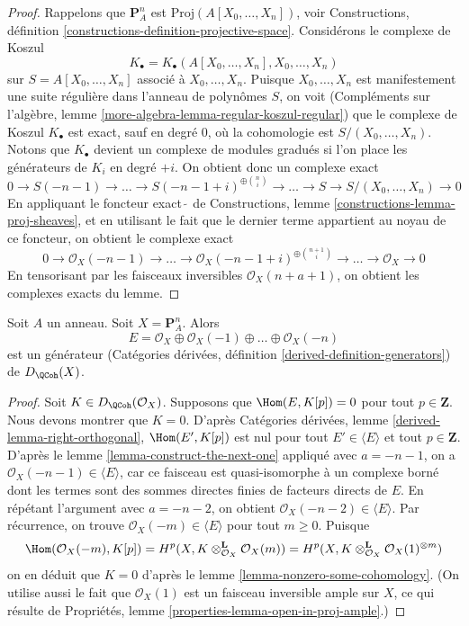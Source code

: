 \begin{proof}
Rappelons que $\mathbf{P}^n_A$ est $\text{Proj}(A[X_0, \ldots, X_n])$, voir
Constructions, définition \ref{constructions-definition-projective-space}.
Considérons le complexe de Koszul
$$
K_\bullet = K_\bullet(A[X_0, \ldots, X_n], X_0, \ldots, X_n)
$$
sur $S = A[X_0, \ldots, X_n]$ associé à $X_0, \ldots, X_n$.
Puisque $X_0, \ldots, X_n$ est manifestement une suite régulière dans
l'anneau de polynômes $S$, on voit
(Compléments sur l'algèbre, lemme \ref{more-algebra-lemma-regular-koszul-regular})
que le complexe de Koszul $K_\bullet$ est exact, sauf en degré $0$,
où la cohomologie est $S/(X_0, \ldots, X_n)$.
Notons que $K_\bullet$ devient un complexe de modules gradués si l'on
place les générateurs de $K_i$ en degré $+i$. On obtient donc un
complexe exact
$$
0 \to S(-n - 1) \to \ldots \to S(-n - 1 + i)^{\oplus {n \choose i}} \to \ldots
\to S \to S/(X_0, \ldots, X_n) \to 0
$$
En appliquant le foncteur exact $\tilde{\ }$ de Constructions,
lemme \ref{constructions-lemma-proj-sheaves}, et en utilisant le fait que
le dernier terme appartient au noyau de ce foncteur,
on obtient le complexe exact
$$
0 \to \mathcal{O}_X(-n - 1) \to \ldots
\to \mathcal{O}_X(-n - 1 + i)^{\oplus {n + 1 \choose i}} \to
\ldots \to \mathcal{O}_X \to 0
$$
En tensorisant par les faisceaux inversibles $\mathcal{O}_X(n + a + 1)$,
on obtient les complexes exacts du lemme.
\end{proof}

\begin{lemma}
\label{lemma-generator-P1}
Soit $A$ un anneau. Soit $X = \mathbf{P}^n_A$. Alors
$$
E =
\mathcal{O}_X \oplus \mathcal{O}_X(-1) \oplus \ldots \oplus \mathcal{O}_X(-n)
$$
est un générateur
(Catégories dérivées, définition \ref{derived-definition-generators})
de $D_\QCoh(X)$.
\end{lemma}

\begin{proof}
Soit $K \in D_\QCoh(\mathcal{O}_X)$. Supposons que
$\Hom(E, K[p]) = 0$ pour tout $p \in \mathbf{Z}$.
Nous devons montrer que $K = 0$.
D'après Catégories dérivées, lemme
\ref{derived-lemma-right-orthogonal},
$\Hom(E', K[p])$ est nul pour tout $E' \in \langle E \rangle$
et tout $p \in \mathbf{Z}$.
D'après le lemme \ref{lemma-construct-the-next-one}
appliqué avec $a = -n - 1$,
on a $\mathcal{O}_X(-n - 1) \in \langle E \rangle$,
car ce faisceau est quasi-isomorphe à un complexe borné
dont les termes sont des sommes directes finies de facteurs directs de $E$.
En répétant l'argument avec $a = -n - 2$, on obtient
$\mathcal{O}_X(-n - 2) \in \langle E \rangle$.
Par récurrence, on trouve $\mathcal{O}_X(-m) \in \langle E \rangle$
pour tout $m \geq 0$.
Puisque
$$
\Hom(\mathcal{O}_X(-m), K[p]) =
H^p(X, K \otimes_{\mathcal{O}_X}^\mathbf{L} \mathcal{O}_X(m)) =
H^p(X, K \otimes_{\mathcal{O}_X}^\mathbf{L} \mathcal{O}_X(1)^{\otimes m})
$$
on en déduit que $K = 0$ d'après le lemme \ref{lemma-nonzero-some-cohomology}.
(On utilise aussi le fait que $\mathcal{O}_X(1)$ est un
faisceau inversible ample sur $X$, ce qui résulte de
Propriétés, lemme \ref{properties-lemma-open-in-proj-ample}.)
\end{proof}

